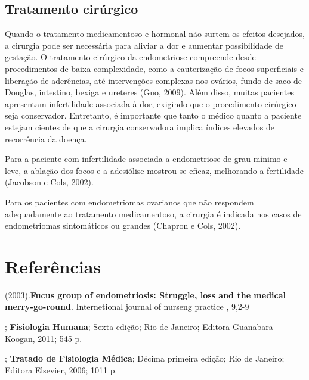\documentclass[12pt]{article} %
\begin{document}
\subsection{Tratamento cirúrgico}

Quando o tratamento medicamentoso e hormonal não surtem os efeitos
desejados, a cirurgia pode ser necessária para aliviar a dor e
aumentar possibilidade de gestação.  O tratamento cirúrgico da
endometriose compreende desde procedimentos de baixa complexidade,
como a cauterização de focos superficiais e liberação de aderências, até
intervenções complexas nos ovários, fundo de saco de Douglas,
intestino, bexiga e ureteres (Guo, 2009). Além disso, muitas pacientes
apresentam infertilidade associada à dor, exigindo que o procedimento
cirúrgico seja conservador. Entretanto, é importante que tanto o
médico quanto a paciente estejam cientes de que a cirurgia
conservadora implica índices elevados de recorrência da doença. %

Para a paciente com infertilidade associada a endometriose de grau
mínimo e leve, a ablação dos focos e a adesiólise mostrou-se eficaz,
melhorando a fertilidade (Jacobson e Cols, 2002).

Para os pacientes com endometriomas ovarianos que não respondem
adequadamente ao tratamento medicamentoso, a cirurgia é indicada nos
casos de endometriomas sintomáticos ou grandes (Chapron e Cols, 2002).

\newpage

\section{Referências} 
\setlength{\parindent}{0pt}
(2003).\textbf{Fucus group of endometriosis: Struggle, loss and the medical merry-go-round}. Internetional journal of nurseng practice , 9,2-9

\vspace{0,5cm}

; \textbf{ Fisiologia Humana}; Sexta edição; Rio de Janeiro; Editora Guanabara Koogan, 2011; 545 p.

\vspace{0,5cm}

;\textbf{ Tratado de Fisiologia Médica};
Décima primeira edição; Rio de Janeiro; Editora Elsevier, 2006; 1011 p.

\vspace{0,5cm}
\end{document}
